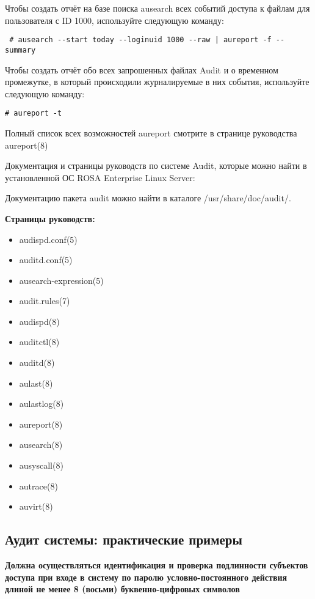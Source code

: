 \documentclass[a4paper,10pt,twoside]{article}
\begin{document}
Чтобы создать отчёт на базе поиска ausearch всех событий доступа к файлам для пользователя с ID 1000, используйте следующую команду:
\begin{verbatim}
 # ausearch --start today --loginuid 1000 --raw | aureport -f --summary
\end{verbatim} 

Чтобы создать отчёт обо всех запрошенных файлах Audit и о временном промежутке, в который происходили журналируемые в них события, используйте следующую команду:
\begin{verbatim}
# aureport -t
\end{verbatim} 

Полный список всех возможностей aureport смотрите в странице руководства aureport(8) 

Документация и страницы руководств по системе Audit, которые можно найти в установленной ОС ROSA Enterprise Linux Server:  

Документацию пакета audit можно найти в каталоге /usr/share/doc/audit/. 

\textbf{⁠Страницы руководств:}
\begin{itemize}
 \item audispd.conf(5)
\item auditd.conf(5)
\item ausearch-expression(5)
\item audit.rules(7)
\item audispd(8)
\item auditctl(8)
\item auditd(8)
\item aulast(8)
\item aulastlog(8)
\item aureport(8)
\item ausearch(8)
\item ausyscall(8)
\item autrace(8)
\item auvirt(8)
\end{itemize}



\subsection{Аудит системы: практические примеры}

 \textbf{Должна осуществляться идентификация и проверка подлинности субъектов доступа при входе в систему по паролю условно-постоянного действия длиной не менее 8 (восьми) буквенно-цифровых символов}
\end{document}
